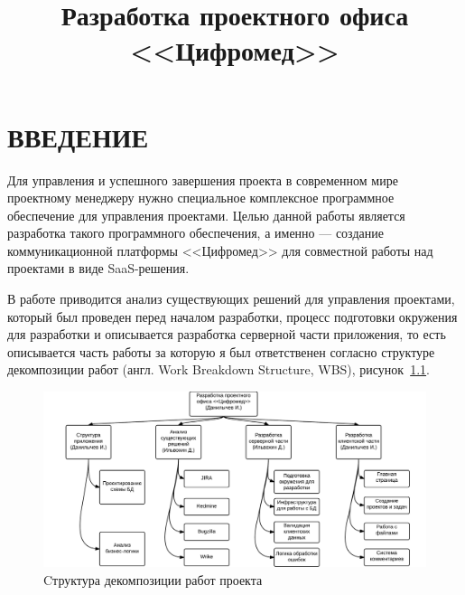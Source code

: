 \documentclass[14pt, a4paper]{extreport}
\title{Разработка проектного офиса <<Цифромед>>}
\date{}
\begin{document}
\pagestyle{plain}

\renewcommand\abstractname{\MakeTextUppercase{Реферат}}

\newpage
\vspace*{-25mm}
\tableofcontents
\newpage


\chapter{\MakeTextUppercase{Введение}}
Для управления и успешного завершения проекта в современном мире проектному
менеджеру нужно специальное комплексное программное обеспечение для управления
проектами. Целью данной работы является разработка такого программного обеспечения,
а именно --- создание коммуникационной платформы <<Цифромед>> для совместной работы
над проектами в виде SaaS-решения.

В работе приводится анализ существующих решений для управления проектами, который
был проведен перед началом разработки, процесс подготовки окружения для разработки и описывается
разработка серверной части приложения, то есть описывается часть работы за которую я был ответственен
согласно структуре декомпозиции работ (англ. Work Breakdown Structure, WBS), рисунок~\ref{fig:wbo}.

\begin{figure}[!htb]
  \centering
    \includegraphics[scale=0.25]{../shared_images/wbs.png}
    \caption{Cтруктура декомпозиции работ проекта}
    \label{fig:wbo}
\end{figure}
\end{document}
